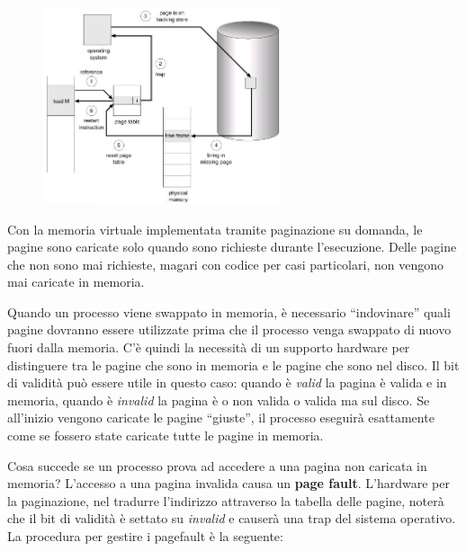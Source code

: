 \documentclass[a4paper]{article}
\begin{document}
\begin{figure}
    \includegraphics[width=7cm]{img/pagefault.JPG}
\end{figure}

Con la memoria virtuale implementata tramite paginazione su domanda, le pagine sono caricate solo quando sono richieste durante l'esecuzione. Delle pagine che non sono mai richieste, magari con codice per casi particolari, non vengono mai caricate in memoria.

Quando un processo viene swappato in memoria, è necessario ``indovinare'' quali pagine dovranno essere utilizzate prima che il processo venga swappato di nuovo fuori dalla memoria. C'è quindi la necessità di un supporto hardware per distinguere tra le pagine che sono in memoria e le pagine che sono nel disco. Il bit di validità può essere utile in questo caso: quando è \textit{valid} la pagina è valida e in memoria, quando è \textit{invalid} la pagina è o non valida o valida ma sul disco. Se all'inizio vengono caricate le pagine ``giuste'', il processo eseguirà esattamente come se fossero state caricate tutte le pagine in memoria.

Cosa succede se un processo prova ad accedere a una pagina non caricata in memoria? L'accesso a una pagina invalida causa un \textbf{page fault}. L'hardware per la paginazione, nel tradurre l'indirizzo attraverso la tabella delle pagine, noterà che il bit di validità è settato su \textit{invalid} e causerà una trap del sistema operativo. La procedura per gestire i pagefault è la seguente:
\end{document}
